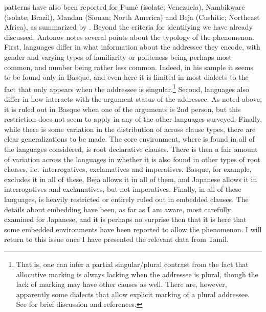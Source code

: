 \documentclass[output=paper, modfonts, nonflat]{langsci/langscibook}
\begin{document}
\allagr{} patterns have also been reported for Pum\'e (isolate;
Venezuela), Nambikware (isolate; Brazil), Mandan (Siouan; North
America) and Beja (Cushitic; Northeast Africa), as summarized by
\citet{antonov:2015}. Beyond the criteria for identifying \allagr{} we
have already discussed, Antonov notes several points about the
typology of the phenomenon. First, languages differ in what
information about the addressee they encode, with gender and varying
types of familiarity or politeness being perhaps most common, and
number being rather less common. Indeed, in his sample it seems to be
found only in Basque, and even here it is limited in most dialects to
the fact that \allagr{} only appears when the addressee is
singular.\footnote{That is, one can infer a partial singular/plural
  contrast from the fact that allocutive marking is always lacking
  when the addressee is plural, though the lack of marking may have
  other causes as well. There are, however, apparently some dialects
  that allow explicit marking of a plural addressee. See
  \citet{antonov:2015} for brief discussion and references.} Second,
languages also differ in how \allagr{} interacts with the argument
status of the addressee. As noted above, it is ruled out in Basque
when one of the arguments is 2nd person, but this restriction does not
seem to apply in any of the other languages surveyed. Finally, while
there is some variation in the distribution of \allagr{} across clause
types, there are clear generalizations to be made. The core
environment, where \allagr{} is found in all of the languages
considered, is root declarative clauses. There is then a fair amount
of variation across the languages in whether it is also found in other
types of root clauses, i.e.\ interrogatives, exclamatives and
imperatives. Basque, for example, excludes it in all of these, Beja
allows it in all of them, and Japanese allows it in interrogatives and
exclamatives, but not imperatives. Finally, in all of these languages,
\allagr{} is heavily restricted or entirely ruled out in embedded
clauses. The details about embedding have been, as far as I am aware,
most carefully examined for Japanese, and it is perhaps no surprise
then that it is here that some embedded environments have been
reported to allow the phenomenon. I will return to this issue once I
have presented the relevant data from Tamil.
\end{document}
